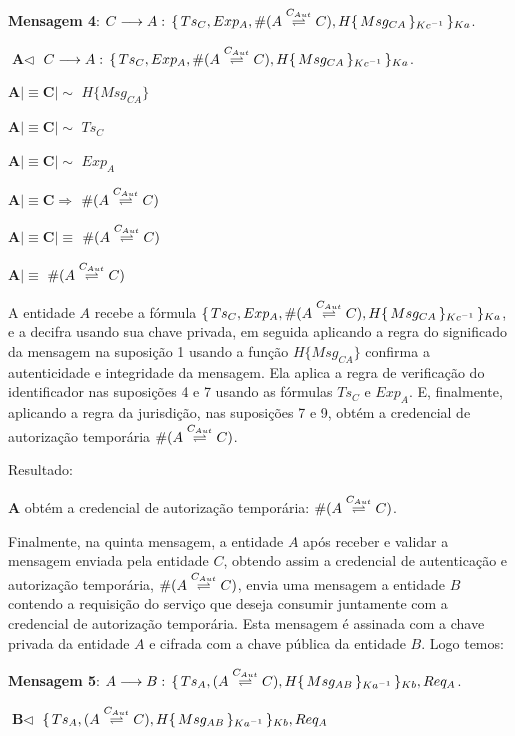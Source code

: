 \textbf{Mensagem 4}: ${C}\longrightarrow{A}:\,{\{\,{Ts_C,Exp_A,\#({A}\stackrel{{C_{Aut}}}{\rightleftharpoons}{C}),H{\{\,{Msg_{CA}}\,\}_{Kc ^{-1}}}}\,\}_{Ka}}$.

$\textbf{A}\triangleleft$ ${C}\longrightarrow{A}:\,{\{\,{Ts_C,Exp_A,\#({A}\stackrel{{C_{Aut}}}{\rightleftharpoons}{C}),H{\{\,{Msg_{CA}}\,\}_{Kc ^{-1}}}}\,\}_{Ka}}$.

$\textbf{A}\mid\equiv \textbf{C} \mid\sim $  $H \{Msg_{CA}\}$

$\textbf{A}\mid\equiv \textbf{C} \mid\sim$ ${Ts_C}$

$\textbf{A}\mid\equiv \textbf{C} \mid\sim$ ${Exp_A}$

$\textbf{A}\mid\equiv \textbf{C} \Rightarrow $  ${\#({A}\stackrel{{C_{Aut}}}{\rightleftharpoons}{C})}$

$\textbf{A}\mid\equiv \textbf{C} \mid\equiv $  ${\#({A}\stackrel{{C_{Aut}}}{\rightleftharpoons}{C})}$

$\textbf{A}\mid\equiv$ ${\#({A}\stackrel{{C_{Aut}}}{\rightleftharpoons}{C})}$

A entidade ${A}$ recebe a fórmula ${\{\,{Ts_C,Exp_A,\#({A}\stackrel{{C_{Aut}}}{\rightleftharpoons}{C}),H{\{\,{Msg_{CA}}\,\}_{Kc ^{-1}}}}\,\}_{Ka}}$, e a decifra usando sua chave privada, em seguida aplicando a regra do significado da mensagem na suposição 1 usando a função $H \{Msg_{CA}\}$ confirma a autenticidade e integridade da mensagem. Ela aplica a regra de verificação do identificador nas suposições 4 e 7 usando as fórmulas ${Ts_C}$  e ${Exp_A}$. E, finalmente, aplicando a regra da jurisdição, nas suposições 7 e 9, obtém a credencial de autorização temporária ${\#({A}\stackrel{{C_{Aut}}}{\rightleftharpoons}{C})}$.

Resultado:

${\textbf{A}}$ obtém a credencial de autorização temporária: ${\#({A}\stackrel{{C_{Aut}}}{\rightleftharpoons}{C})}$.

Finalmente, na quinta mensagem, a entidade ${A}$ após receber e validar a mensagem enviada pela entidade ${C}$, obtendo assim a credencial de autenticação e autorização temporária, ${\#({A}\stackrel{{C_{Aut}}}{\rightleftharpoons}{C})}$, envia uma mensagem a entidade ${B}$  contendo a requisição do serviço que deseja consumir juntamente com a credencial de autorização temporária. Esta mensagem é assinada com a chave privada da entidade ${A}$ e cifrada com a chave pública da entidade ${B}$. Logo temos:

\textbf{Mensagem 5}: ${A}\longrightarrow{B}:\,{\{\,{Ts_A,({A}\stackrel{{C_{Aut}}}{\rightleftharpoons}{C}),H{\{\,{Msg_{AB}}\,\}_{Ka ^{-1}}}}\,\}_{Kb}},{Req_A}$.

$\textbf{B}\triangleleft$  ${\{\,{Ts_A,({A}\stackrel{{C_{Aut}}}{\rightleftharpoons}{C}),H{\{\,{Msg_{AB}}\,\}_{Ka ^{-1}}}}\,\}_{Kb}},{Req_A}$

